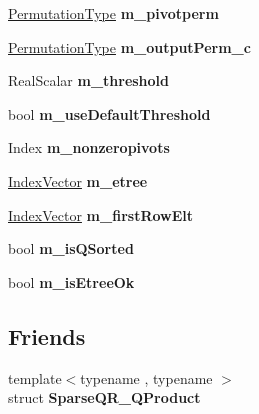 \begin{DoxyCompactItemize}
\mbox{\hyperlink{class_eigen_1_1_permutation_matrix}{Permutation\+Type}} {\bfseries m\+\_\+pivotperm}
\item 
\mbox{\label{class_eigen_1_1_sparse_q_r_a68d82ee61311e78baf0f51da641b3708}} 
\mbox{\hyperlink{class_eigen_1_1_permutation_matrix}{Permutation\+Type}} {\bfseries m\+\_\+output\+Perm\+\_\+c}
\item 
\mbox{\label{class_eigen_1_1_sparse_q_r_a6d78507f2f5c20b0e84e49964f7f6663}} 
Real\+Scalar {\bfseries m\+\_\+threshold}
\item 
\mbox{\label{class_eigen_1_1_sparse_q_r_abeff33393a04cec953b58e0ee3fe4ecb}} 
bool {\bfseries m\+\_\+use\+Default\+Threshold}
\item 
\mbox{\label{class_eigen_1_1_sparse_q_r_a46529756e4ff75196644415dfdc43306}} 
Index {\bfseries m\+\_\+nonzeropivots}
\item 
\mbox{\label{class_eigen_1_1_sparse_q_r_a50c58a6962f17566a4b36b818ab9c776}} 
\mbox{\hyperlink{class_eigen_1_1_matrix}{Index\+Vector}} {\bfseries m\+\_\+etree}
\item 
\mbox{\label{class_eigen_1_1_sparse_q_r_a1f5d40c6611c8440c6be0406908a7319}} 
\mbox{\hyperlink{class_eigen_1_1_matrix}{Index\+Vector}} {\bfseries m\+\_\+first\+Row\+Elt}
\item 
\mbox{\label{class_eigen_1_1_sparse_q_r_aeef52b7e7b754a39a433f74b18c7b76c}} 
bool {\bfseries m\+\_\+is\+Q\+Sorted}
\item 
\mbox{\label{class_eigen_1_1_sparse_q_r_a8463be9ca3404afb68e792a57f57a987}} 
bool {\bfseries m\+\_\+is\+Etree\+Ok}
\end{DoxyCompactItemize}
\subsection*{Friends}
\begin{DoxyCompactItemize}
\item 
\mbox{\label{class_eigen_1_1_sparse_q_r_af9b447255bbccd5da503ef3f77798701}} 
{\footnotesize template$<$typename , typename $>$ }\\struct {\bfseries Sparse\+Q\+R\+\_\+\+Q\+Product}
\end{DoxyCompactItemize}


